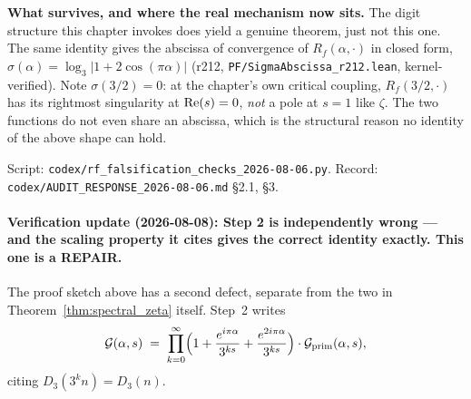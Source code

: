 \noindent \textbf{What survives, and where the real mechanism now sits.} The
digit structure this chapter invokes does yield a genuine theorem, just not
this one. The same identity gives the abscissa of convergence of
$R_f(\alpha,\cdot)$ in closed form, $\sigma(\alpha)=\log_3|1+2\cos(\pi\alpha)|$
(r212, \texttt{PF/SigmaAbscissa\_r212.lean}, kernel-verified). Note
$\sigma(3/2)=0$: at the chapter's own critical coupling, $R_f(3/2,\cdot)$ has
its rightmost singularity at $\operatorname{Re}(s)=0$, \emph{not} a pole at $s=1$ like
$\zeta$. The two functions do not even share an abscissa, which is the
structural reason no identity of the above shape can hold.

\noindent Script: \texttt{codex/rf\_falsification\_checks\_2026-08-06.py}.
Record: \texttt{codex/AUDIT\_RESPONSE\_2026-08-06.md} \S2.1, \S3.

\paragraph{Verification update (2026-08-08): Step 2 is independently wrong ---
and the scaling property it cites gives the correct identity exactly. This one
is a REPAIR.}
The proof sketch above has a second defect, separate from the two in
Theorem~\ref{thm:spectral_zeta} itself. Step~2 writes
\[
  \mathcal{G}(\alpha,s)
  \;=\; \prod_{k=0}^{\infty}\Bigl(1+\frac{e^{i\pi\alpha}}{3^{ks}}
        +\frac{e^{2i\pi\alpha}}{3^{ks}}\Bigr)\cdot
        \mathcal{G}_{\mathrm{prim}}(\alpha,s),
\]
citing $D_3(3^k n)=D_3(n)$.

